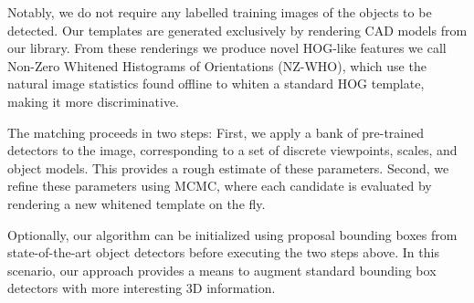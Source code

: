 \documentclass[10pt,twocolumn,letterpaper]{article}
\begin{document}
Notably, we do not require any labelled training images of the objects to be
detected. Our templates are generated exclusively by rendering CAD models from
our library. From these renderings we produce novel HOG-like features we call
Non-Zero Whitened Histograms of Orientations (NZ-WHO), which use the natural
image statistics found offline to whiten a standard HOG template, making it
more discriminative.

The matching proceeds in two steps: First, we apply a bank of pre-trained
detectors to the image, corresponding to a set of discrete viewpoints, scales,
and object models. This provides a rough estimate of these parameters. Second,
we refine these parameters using MCMC, where each candidate is evaluated by
rendering a new whitened template on the fly. 

Optionally, our algorithm can be initialized using proposal bounding boxes from
state-of-the-art object detectors \cite{Felzenszwalb10,Girshick14} before
executing the two steps above. In this scenario, our approach provides a means
to augment standard bounding box detectors with more interesting 3D
information.
\end{document}
